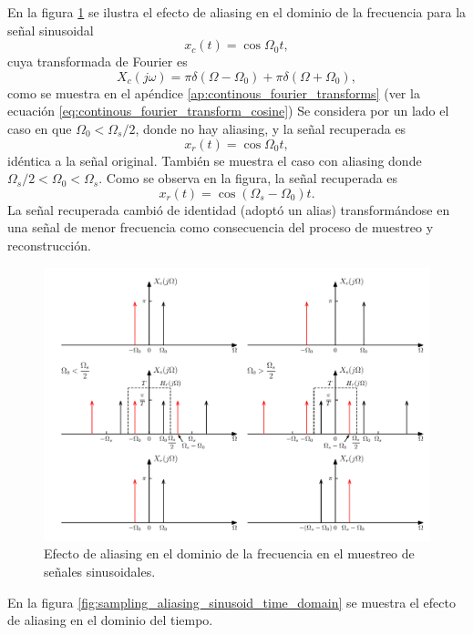 \documentclass[a4paper]{report}
\begin{document}
En la figura \ref{fig:sampling_aliasing_sinusoid} se ilustra el efecto de aliasing en el dominio de la frecuencia para la señal sinusoidal
\[
 x_c(t)=\cos\Omega_0t,
\]
cuya transformada de Fourier es
\[
X_c(j\omega)=\pi\delta\left(\Omega-\Omega_0\right)+\pi\delta\left(\Omega+\Omega_0\right),
\]
como se muestra en el apéndice \ref{ap:continous_fourier_transforms} (ver la ecuación \ref{eq:continous_fourier_transform_cosine})
Se considera por un lado el caso en que \(\Omega_0<\Omega_s/2\), donde no hay aliasing, y la señal recuperada es
\[
 x_r(t)=\cos\Omega_0t,
\]
idéntica a la señal original. También se muestra el caso con aliasing donde \(\Omega_s/2<\Omega_0<\Omega_s\). Como se observa en la figura, la señal recuperada es
\[
 x_r(t)=\cos(\Omega_s-\Omega_0)t.
\]
La señal recuperada cambió de identidad (adoptó un alias) transformándose en una señal de menor frecuencia como consecuencia del proceso de muestreo y reconstrucción.
\begin{figure}[!htb]
 \begin{center}
 \includegraphics[width=\textwidth]{figuras/sampling_aliasing_sinusoid.pdf}
 \caption{\label{fig:sampling_aliasing_sinusoid} Efecto de aliasing en el dominio de la frecuencia en el muestreo de señales sinusoidales.}
 \end{center}
\end{figure}
En la figura \ref{fig:sampling_aliasing_sinusoid_time_domain} se muestra el efecto de aliasing en el dominio del tiempo. 
\end{document}

